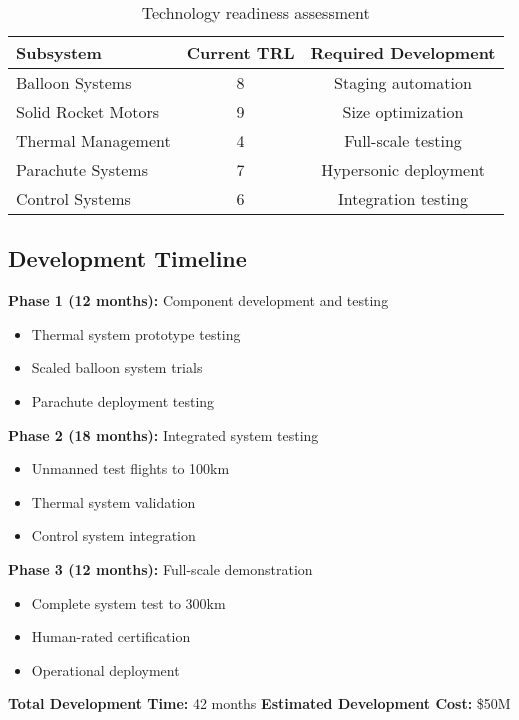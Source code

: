 \documentclass[11pt,a4paper]{article}
\begin{document}
\begin{table}[H]
\centering
\begin{tabular}{@{}lcc@{}}
\toprule
\textbf{Subsystem} & \textbf{Current TRL} & \textbf{Required Development} \\
\midrule
Balloon Systems & 8 & Staging automation \\
Solid Rocket Motors & 9 & Size optimization \\
Thermal Management & 4 & Full-scale testing \\
Parachute Systems & 7 & Hypersonic deployment \\
Control Systems & 6 & Integration testing \\
\bottomrule
\end{tabular}
\caption{Technology readiness assessment}
\label{tab:trl_assessment}
\end{table}

\subsection{Development Timeline}

\textbf{Phase 1 (12 months):} Component development and testing
\begin{itemize}
    \item Thermal system prototype testing
    \item Scaled balloon system trials
    \item Parachute deployment testing
\end{itemize}

\textbf{Phase 2 (18 months):} Integrated system testing
\begin{itemize}
    \item Unmanned test flights to 100km
    \item Thermal system validation
    \item Control system integration
\end{itemize}

\textbf{Phase 3 (12 months):} Full-scale demonstration
\begin{itemize}
    \item Complete system test to 300km
    \item Human-rated certification
    \item Operational deployment
\end{itemize}

\textbf{Total Development Time:} 42 months
\textbf{Estimated Development Cost:} \$50M
\end{document}
